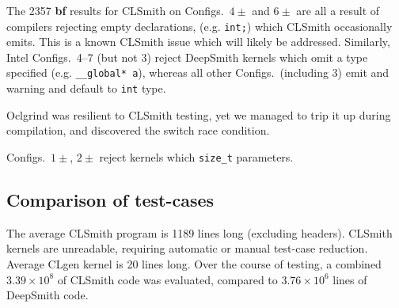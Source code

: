 

The 2357 \textbf{bf} results for CLSmith on Configs.\ $4\pm$ and $6\pm$ are all a result of compilers rejecting empty declarations, (e.g. \texttt{int;}) which CLSmith occasionally emits. This is a known CLSmith issue which will likely be addressed.
Similarly, Intel Configs.\ 4--7 (but not 3) reject DeepSmith kernels which omit a type specified (e.g. \texttt{\_\_global* a}), whereas all other Configs.\ (including 3) emit and warning and default to \texttt{int} type.


Oclgrind was resilient to CLSmith testing, yet we managed to trip it up during compilation, and discovered the switch race condition.

Configs.\ $1\pm$, $2\pm$ reject kernels which \texttt{size\_t} parameters.


\subsection{Comparison of test-cases}

The average CLSmith program is 1189 lines long (excluding headers). CLSmith kernels are unreadable, requiring automatic or manual test-case reduction.
Average CLgen kernel is 20 lines long.
Over the course of testing, a combined $3.39 \times 10^8$ of CLSmith code was evaluated, compared to $3.76 \times 10^6$ lines of DeepSmith code.

